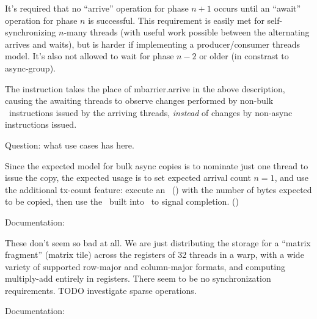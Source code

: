 It's required that no ``arrive'' operation for phase $n+1$ occurs until an ``await'' operation for phase $n$ is successful. This requirement is easily met for self-synchronizing $n$-many threads (with useful work possible between the alternating arrives and waits), but is harder if implementing a producer/consumer threads model. It's also not allowed to wait for phase $n-2$ or older (in constrast to async-group).

\filbreak
{} The  instruction takes the place of mbarrier.arrive in the above description, causing the awaiting threads to observe changes performed by non-bulk \cpAsync\ instructions issued by the arriving threads, \textit{instead} of changes by non-async instructions issued.

Question: what use cases  has here.

\filbreak
{} Since the expected model for bulk async copies is to nominate just one thread to issue the copy, the expected usage is to set expected arrival count $n = 1$, and use the additional tx-count feature: execute an \expectTxOperation\ () with the number of bytes expected to be copied, then use the \completeTxOperation\ built into \cpAsyncBulk\ to signal completion. ()

\filbreak
{}

Documentation: 

These don't seem so bad at all. We are just distributing the storage for a ``matrix fragment'' (matrix tile) across the registers of 32 threads in a warp, with a wide variety of supported row-major and column-major formats, and computing multiply-add entirely in registers. There seem to be no synchronization requirements. TODO investigate sparse operations.

\filbreak
{}

Documentation: 

